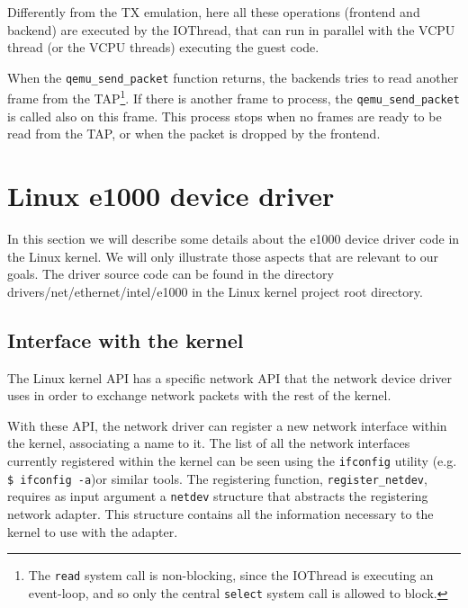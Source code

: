 Differently from the TX emulation, here all these operations (frontend and backend) are executed by the IOThread, that can run in parallel
with the VCPU thread (or the VCPU threads) executing the guest code.

\vspace{0.5cm}

When the \texttt{qemu\_send\_packet} function returns, the backends tries to read another frame from the TAP\footnote{The \texttt{read}
system call is non-blocking, since the IOThread is executing an event-loop, and so only the central \texttt{select} system call is
allowed to block.}. If there is another frame to process, the \texttt{qemu\_send\_packet} is called also on this frame.
This process stops when no frames are ready to be read from the TAP, or when the packet is dropped by the frontend.



\section{Linux e1000 device driver}
In this section we will describe some details about the e1000 device driver code in the Linux kernel.
We will only illustrate those aspects that are relevant to our goals.
The driver source code can be found in the directory drivers/net/ethernet/intel/e1000 in the Linux kernel project root directory.

\subsection{Interface with the kernel}
The Linux kernel API has a specific network API that the network device driver uses in order to exchange network packets with
the rest of the kernel.

With these API, the network driver can register a new network interface within the kernel, associating a name to it.
The list of all the network interfaces currently registered within the kernel can be seen using the \texttt{ifconfig} utility
(e.g. \texttt{\$ ifconfig -a})or similar tools.
The registering function, \texttt{register\_netdev}, requires as input argument a \texttt{netdev} structure that abstracts the
registering network adapter. This structure contains all the information necessary to the kernel to use with the adapter.


